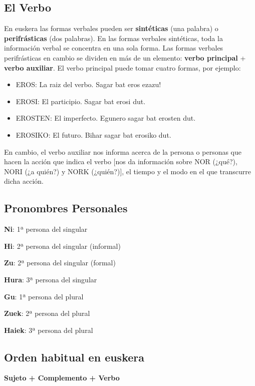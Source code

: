 \documentclass[11pt, a4paper]{article}
\begin{document}
\subsection{El Verbo}
En euskera las formas verbales pueden ser \textbf{sintéticas} (una palabra) o \textbf{perifrásticas} (dos palabras). En las formas verbales sintéticas, toda la información verbal se concentra en una sola forma. Las formas verbales perifrásticas en cambio se dividen en más de un elemento: \textbf{verbo principal} + \textbf{verbo auxiliar}. El verbo principal puede tomar cuatro formas, por ejemplo:
\begin{itemize}
\item EROS: La raiz del verbo. Sagar bat eros ezazu!
\item EROSI: El participio. Sagar bat erosi dut.
\item EROSTEN: El imperfecto. Egunero sagar bat erosten dut.
\item EROSIKO: El futuro. Bihar sagar bat erosiko dut.
\end{itemize}
En cambio, el verbo auxiliar nos informa acerca de la persona o personas que hacen la acción que indica el verbo [nos da información sobre NOR (¿qué?), NORI (¿a quién?) y NORK (¿quién?)], el tiempo y el modo en el que transcurre dicha acción.

\subsection{Pronombres Personales}
\begin{itemize}
\begin{multicols}{2}
\item \textbf{Ni}:  1ª persona del singular
\item \textbf{Hi}:  2ª persona del singular (informal)
\item \textbf{Zu}:  2ª persona del singular (formal)
\item \textbf{Hura}:  3ª persona del singular
\item \textbf{Gu}:  1ª persona del plural
\item \textbf{Zuek}:  2ª persona del plural
\item \textbf{Haiek}:  3ª persona del plural
\end{multicols}
\end{itemize}

\subsection{Orden habitual en euskera}
\indent \indent \textbf{Sujeto + Complemento + Verbo}\\
\end{document}

